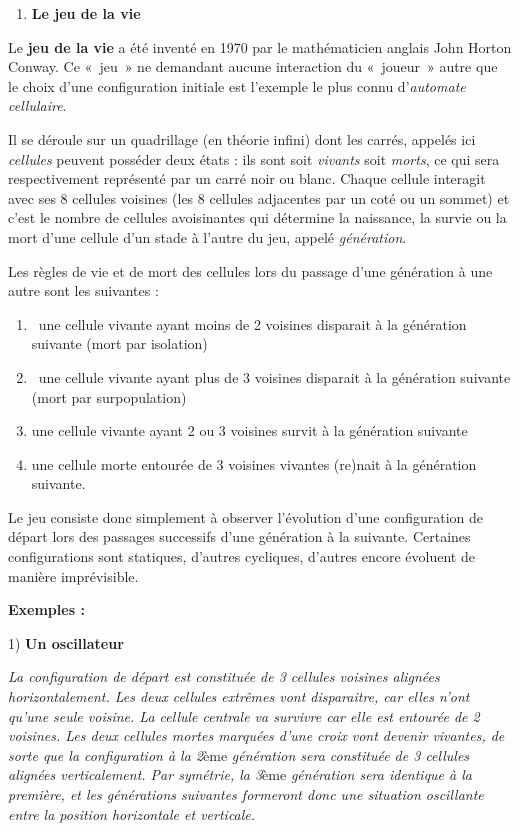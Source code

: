 \bigskip

\liststyleExercice
\begin{enumerate}
\item {\sffamily\bfseries
Le jeu de la vie}
\end{enumerate}
{
{Le }{\textbf{jeu de la
vie}}{ a été inventé en 1970 par le
mathématicien anglais John Horton Conway. Ce «~jeu~» ne demandant
aucune interaction du «~joueur~» autre que le choix d’une configuration
initiale est l’exemple le plus connu
d’}{\textit{automate
cellulaire}}{.}}

{
{Il se déroule sur un quadrillage (en théorie
infini) dont les carrés, appelés ici
}{\textit{cellules}}{
peuvent posséder deux états : ils sont soit
}{\textit{vivants}}{
soit
}{\textit{morts}}{, ce
qui sera respectivement représenté par un carré noir ou blanc. Chaque
cellule interagit avec ses 8 cellules voisines (les 8 cellules
adjacentes par un coté ou un sommet) et c’est le nombre de cellules
avoisinantes qui détermine la naissance, la survie ou la mort d’une
cellule d’un stade à l’autre du jeu, appelé
}{\textit{génération}}{.}}

{
Les règles de vie et de mort des cellules lors du passage d’une
génération à une autre sont les suivantes :}

\liststyleNumberingi
\begin{enumerate}
\item {
\ une cellule vivante ayant moins de 2 voisines disparait à la
génération suivante (mort par isolation)}
\item {
\ une cellule vivante ayant plus de 3 voisines disparait à la génération
suivante (mort par surpopulation)}
\item {
une cellule vivante ayant 2 ou 3 voisines survit à la génération
suivante}
\item {
une cellule morte entourée de 3 voisines vivantes (re)nait à la
génération suivante.}
\end{enumerate}
{
Le jeu consiste donc simplement à observer l’évolution d’une
configuration de départ lors des passages successifs d’une génération à
la suivante. Certaines configurations sont statiques, d’autres
cycliques, d’autres encore évoluent de manière imprévisible.}

{\bfseries
{Exemples}{ : }}

{\sffamily
{1) }{\textbf{Un
oscillateur}}}


\bigskip

{\sffamily
{\textit{La configuration de départ est
constituée de 3 cellules voisines alignées horizontalement. Les deux
cellules extrêmes vont disparaitre, car elles n’ont qu’une seule
voisine. La cellule centrale va survivre car elle est entourée de 2
voisines. Les deux cellules mortes marquées d’une croix vont devenir
vivantes, de sorte que la configuration à la
2}}ème{\textit{ génération sera constituée de 3
cellules alignées verticalement. Par symétrie, la
3}}ème{\textit{ génération sera identique à la
première, et les générations suivantes formeront donc une situation
oscillante entre la position horizontale et verticale.}}}

